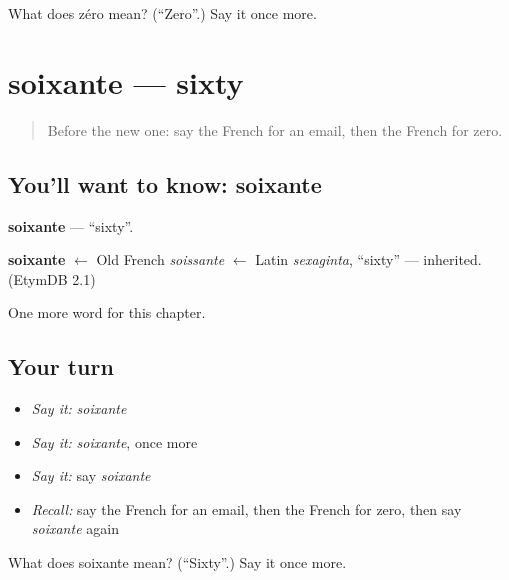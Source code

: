 \begin{tcolorbox}[breakable,colback=teal!4,colframe=teal!35!black,title={Before you move on}]
What does zéro mean? (\textquotedblleft{}Zero\textquotedblright{}.) Say it once more.
\end{tcolorbox}
\section[soixante]{soixante — sixty}

\label{lesson:FR-C136-soixante}



\begin{quote}
Before the new one: say the French for an email, then the French for zero.
\end{quote}

\subsection*{You'll want to know: soixante}
\textbf{soixante} — \textquotedblleft{}sixty\textquotedblright{}.

\begin{cousinweb}
\textbf{soixante} $\leftarrow$ Old French \emph{soissante} $\leftarrow$ Latin \emph{sexaginta}, \textquotedblleft{}sixty\textquotedblright{} — inherited. (EtymDB 2.1)
\end{cousinweb}

\begin{grammarlens}[title={What you've built}]
One more word for this chapter.
\end{grammarlens}

\subsection*{Your turn}
\begin{itemize}
\raggedright
  \item \emph{Say it:} \emph{soixante}
  \item \emph{Say it:} \emph{soixante}, once more
  \item \emph{Say it:} say \emph{soixante}
  \item \emph{Recall:} say the French for an email, then the French for zero, then say \emph{soixante} again
\end{itemize}

\begin{tcolorbox}[breakable,colback=teal!4,colframe=teal!35!black,title={Before you move on}]
What does soixante mean? (\textquotedblleft{}Sixty\textquotedblright{}.) Say it once more.
\end{tcolorbox}
